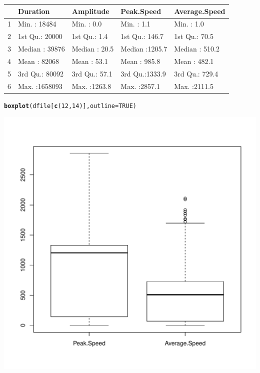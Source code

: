 \documentclass{article}\usepackage[]{graphicx}\usepackage[]{color}
\makeatletter
\def\maxwidth{ %
  \ifdim\Gin@nat@width>\linewidth
    \linewidth
  \else
    \Gin@nat@width
  \fi
}
\newcommand{\hlnum}[1]{\textcolor[rgb]{0.686,0.059,0.569}{#1}}%
\newcommand{\hlstd}[1]{\textcolor[rgb]{0.345,0.345,0.345}{#1}}%
\newcommand{\hlkwc}[1]{\textcolor[rgb]{0.333,0.667,0.333}{#1}}%
\newcommand{\hlkwd}[1]{\textcolor[rgb]{0.737,0.353,0.396}{\textbf{#1}}}%
\newenvironment{kframe}{%
 \def\at@end@of@kframe{}%
 \ifinner\ifhmode%
  \def\at@end@of@kframe{\end{minipage}}%
  \begin{minipage}{\columnwidth}%
 \fi\fi%
 \def\FrameCommand##1{\hskip\@totalleftmargin \hskip-\fboxsep
 \colorbox{shadecolor}{##1}\hskip-\fboxsep
     \hskip-\linewidth \hskip-\@totalleftmargin \hskip\columnwidth}%
 \MakeFramed {\advance\hsize-\width
   \@totalleftmargin\z@ \linewidth\hsize
   \@setminipage}}%
 {\par\unskip\endMakeFramed%
 \at@end@of@kframe}
\newenvironment{knitrout}{}{} %
\makeatother
\begin{document}
\begin{table}[ht]
\centering
\begin{tabular}{rllll}
  \hline
 &    Duration &   Amplitude &   Peak.Speed & Average.Speed \\ 
  \hline
1 & Min.   :  18484   & Min.   :   0.0   & Min.   :   1.1   & Min.   :   1.0   \\ 
  2 & 1st Qu.:  20000   & 1st Qu.:   1.4   & 1st Qu.: 146.7   & 1st Qu.:  70.5   \\ 
  3 & Median :  39876   & Median :  20.5   & Median :1205.7   & Median : 510.2   \\ 
  4 & Mean   :  82068   & Mean   :  53.1   & Mean   : 985.8   & Mean   : 482.1   \\ 
  5 & 3rd Qu.:  80092   & 3rd Qu.:  57.1   & 3rd Qu.:1333.9   & 3rd Qu.: 729.4   \\ 
  6 & Max.   :1658093   & Max.   :1263.8   & Max.   :2857.1   & Max.   :2111.5   \\ 
   \hline
\end{tabular}
\end{table}

\begin{knitrout}
\color{fgcolor}\begin{kframe}
\begin{alltt}
\hlkwd{boxplot}\hlstd{(dfile[}\hlkwd{c}\hlstd{(}\hlnum{12}\hlstd{,}\hlnum{14}\hlstd{)],}\hlkwc{outline}\hlstd{=} \hlnum{TRUE}\hlstd{)}
\end{alltt}
\end{kframe}
\includegraphics[width=\maxwidth]{figure/unnamed-chunk-3} 

\end{knitrout}
\end{document}
